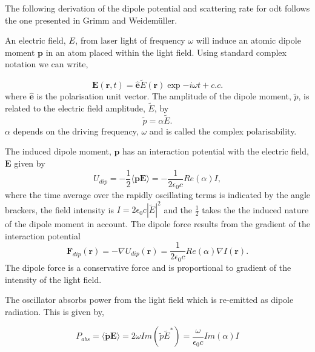 The following derivation of the dipole potential and scattering rate for \gls{odt} follows the one presented in Grimm and Weidem\"uller\cite{grimm_optical_2000}.

An electric field, $\emph{E}$, from laser light of frequency $\omega$ will induce an atomic dipole moment $\boldsymbol{p}$ in an atom placed within the light field. Using standard complex notation we can write,

\begin{equation}\label{eq:efield}
\boldsymbol E (\boldsymbol r ,t)=\hat{\boldsymbol e} \tilde E (\boldsymbol r) \exp{-i\omega t + c.c.}
\end{equation}
where $\hat{\boldsymbol{e}}$ is the polarisation unit vector. The amplitude of the dipole moment, $\tilde p$, is related to the electric field amplitude, $\tilde E$, by
\begin{equation}\label{eq:polarisability}
\tilde p = \alpha \tilde E.
\end{equation}
$\alpha$ depends on the driving frequency, $\omega$ and is called the complex polarisability.

The induced dipole moment, $\boldsymbol p$ has an interaction potential with the electric field, $\boldsymbol E$ given by
\begin{equation}\label{eq:interaction_pot}
U_{dip} = - \frac{1}{2} \langle \boldsymbol{pE} \rangle = - \frac{1}{2 \epsilon_0 c} Re(\alpha)I,
\end{equation}
where the time average over the rapidly oscillating terms is indicated by the angle brackers, the field intensity is $I=2\epsilon_0 c |\tilde E|^2$ and the $\frac{1}{2}$ takes the the induced nature of the dipole moment in account. The dipole force results from the gradient of the interaction potential
\begin{equation}\label{eq:dipole_force}
\boldsymbol F_{dip}(\boldsymbol r ) = - \nabla U_{dip}(\boldsymbol r) = \frac{1}{2 \epsilon_0 c} Re(\alpha) \nabla I(\boldsymbol r).
\end{equation}
The dipole force is a conservative force and is proportional to gradient of the intensity of the light field.

The oscillator absorbs power from the light field which is re-emitted as dipole radiation. This is given by,

\begin{equation}\label{eq:power_absorbed}
P_{abs} = \langle \boldsymbol{\dot p E} \rangle = 2 \omega Im(\tilde p \tilde E^*) = \frac{\omega}{\epsilon_0 c} Im (\alpha) I
\end{equation}

